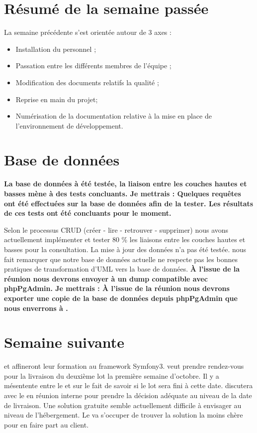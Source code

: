 \documentclass [a4paper] {article}
\begin{document}
\section{Résumé de la semaine passée}
La semaine précédente s'est orientée autour de 3 axes :  
\begin{itemize}
\item Installation du personnel ;
\item Passation entre les différents membres de l'équipe ;
\item Modification des documents relatifs la qualité ;
\item Reprise en main du projet;
\item Numérisation de la documentation relative à la mise en place de l'environnement de développement.
\end{itemize} 

\section{Base de données}
\textbf{La base de données à été testée, la liaison entre les couches hautes et basses mène à des tests concluants. Je mettrais : Quelques requêtes ont été effectuées sur la base de données afin de la tester. Les résultats de ces tests ont été concluants pour le moment.} 

Selon le processus CRUD (créer - lire - retrouver - supprimer) nous avons actuellement implémenter et tester 80 \% les liaisons entre les couches hautes et basses pour la consultation. La mise à jour des données n'a pas été testée. \nomTuteurPedago{} nous fait remarquer que notre base de données actuelle ne respecte pas les bonnes pratiques de transformation d'UML vers la base de données. 
\textbf{À l'issue de la réunion nous devrons envoyer à \nomTuteurPedago{} un dump compatible avec phpPgAdmin. Je mettrais : À l'issue de la réunion nous devrons exporter une copie de la base de données depuis phpPgAdmin que nous enverrons à \nomTuteurPedago{}. }

\section{Semaine suivante}
\Francois{} et \Juliana{} affineront leur formation au framework Symfony3. 
\Pierre{} veut prendre rendez-vous pour la livraison du deuxième lot la première semaine d'octobre. Il y a mésentente entre le \RD{} et \Pierre{} sur le fait de savoir si le lot sera fini à cette date. \Pierre{} discutera avec le \RD{} en réunion interne pour prendre la décision adéquate au niveau de la date de livraison. Une solution gratuite semble actuellement difficile à envisager au niveau de l'hébergement. Le \CP{} va s'occuper de trouver la solution la moins chère pour en faire part au client.
\end{document}
